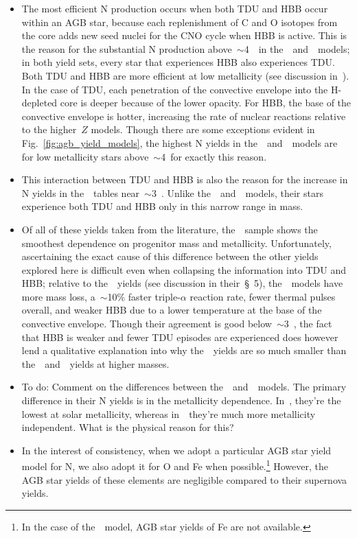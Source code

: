 \documentclass[ms.tex]{subfiles}
\begin{document}
\begin{itemize}
	\item The most efficient N production occurs when both TDU and HBB 
	occur within an AGB star, because each replenishment of C and O 
	isotopes from the core adds new seed nuclei for the CNO cycle when HBB 
	is active. 
	This is the reason for the substantial N production 
	above~$\sim$4~\msun~in the~\karakasten~and~\karakas~models; in both 
	yield sets, every star that experiences HBB also experiences TDU. 
	Both TDU and HBB are more efficient at low metallicity (see discussion 
	in~\ventura). 
	In the case of TDU, each penetration of the convective envelope into 
	the H-depleted core is deeper because of the lower opacity. 
	For HBB, the base of the convective envelope is hotter, increasing the 
	rate of nuclear reactions relative to the higher~$Z$ models. 
	Though there are some exceptions evident in Fig.~\ref{fig:agb_yield_models}, 
	the highest N yields in the~\karakasten~and~\karakas~models are for low 
	metallicity stars above~$\sim$4~\msun for exactly this reason. 

	\item This interaction between TDU and HBB is also the reason for the 
	increase in N yields in the~\ventura~tables near~$\sim$3~\msun. 
	Unlike the~\karakasten~and~\karakas~models, their stars experience 
	both TDU and HBB only in this narrow range in mass. 

	\item Of all of these yields taken from the literature, 
	the~\cristallo~sample shows the smoothest dependence on progenitor mass 
	and metallicity. 
	Unfortunately, ascertaining the exact cause of this difference between 
	the other yields explored here is difficult even when collapsing the 
	information into TDU and HBB; relative to the~\karakas~yields (see 
	discussion in their~\S~5), the~\cristallo~models have more mass loss, 
	a~$\sim$10\% faster triple-$\alpha$ reaction rate, fewer thermal pulses 
	overall, and weaker HBB due to a lower temperature at the base of the 
	convective envelope. 
	Though their agreement is good below~$\sim$3~\msun, the fact that 
	HBB is weaker and fewer TDU episodes are experienced does however lend 
	a qualitative explanation into why the~\cristallo~yields are so much 
	smaller than the~\karakasten~and~\karakas~yields at higher masses. 

	\item {\color{red} To do: Comment on the differences between 
	the~\karakasten~and~\karakas~models. 
	The primary difference in their N yields is in the metallicity dependence. 
	In~\karakasten, they're the lowest at solar metallicity, whereas 
	in~\karakas~they're much more metallicity independent. 
	What is the physical reason for this? 
	} 

	\item In the interest of consistency, when we adopt a particular AGB star 
	yield model for N, we also adopt it for O and Fe when possible.\footnote{
		In the case of the~\ventura~model, AGB star yields of Fe are not 
		available. 
	} 
	However, the AGB star yields of these elements are negligible compared to 
	their supernova yields. 
\end{itemize} 
\end{document}
